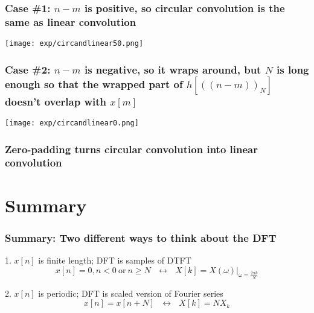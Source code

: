 \documentclass{beamer}
\begin{document}
\begin{frame}
  \frametitle{Case \#1: $n-m$ is positive, so circular
    convolution is the same as linear convolution}

  \centerline{\texttt{[image: exp/circandlinear50.png]}}
\end{frame}
  
\begin{frame}
  \frametitle{Case \#2: $n-m$ is negative, so it wraps around, but $N$
    is long enough so that the wrapped part of
    $h\left[(\!(n-m)\!)_N\right]$ doesn't overlap with $x[m]$}
  
  \centerline{\texttt{[image: exp/circandlinear0.png]}}
\end{frame}
  
\begin{frame}
  \frametitle{Zero-padding turns circular convolution into linear convolution}

  \centerline{}
\end{frame}



\section[Summary]{Summary}
\setcounter{subsection}{1}

\begin{frame}
  \frametitle{Summary: Two different ways to think about the DFT}
  \begin{block}{1. $x[n]$ is finite length; DFT is samples of DTFT}
    \begin{displaymath}
      x[n]=0,n<0~\text{or}~n\ge N~~~\leftrightarrow~~~X[k]=\left.X(\omega)\right|_{\omega=\frac{2\pi k}{N}}
    \end{displaymath}
  \end{block}
  \begin{block}{2. $x[n]$ is periodic; DFT is scaled version of Fourier series}
    \begin{displaymath}
      x[n]=x[n+N]~~~\leftrightarrow~~~X[k]=N X_k
    \end{displaymath}
  \end{block}
\end{frame}
\end{document}
